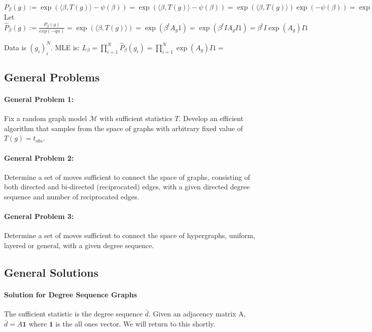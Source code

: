 \documentclass{article}
\theoremstyle{definition}
\begin{document}
\( P_\beta(g) := \exp( \langle \beta, T(g) \rangle - \psi(\beta) ) 
= \exp( \langle \beta, T(g) \rangle - \psi(\beta) ) 
= \exp( \langle \beta, T(g) \rangle) \exp( - \psi(\beta) ) 
= \exp( \langle \beta, T(g) \rangle) \exp( - qn ) 
\)
Let $\hat{P}_\beta(g) := \frac{P_\beta(g)}{exp(-qn)} = \exp( \langle \beta, T(g) \rangle) = \exp(\beta^t A_g 1) = \exp(\beta^t I A_g I 1) = \beta^t I \exp(A_g ) I 1  $

Data is $(g_i)_i^N$.
MLE is: $L_\beta = \prod_{i=1}^N \hat{P}_\beta(g_i) = \prod_{i=1}^N\exp(A_g ) I 1 = $

\subsection{General Problems}

\paragraph{General Problem 1:} Fix a random graph model $\mathcal{M}$ with sufficient statistics $T$. Develop an efficient algorithm that samples from the space of graphs with arbitrary fixed value of $T(g) = t_{obs}$.

\paragraph{General Problem 2:} Determine a set of moves sufficient to connect the space of graphs, consisting of both directed and bi-directed (reciprocated) edges, with a given directed degree sequence and number of reciprocated edges.

\paragraph{General Problem 3:} Determine a set of moves sufficient to connect the space of hypergraphs, uniform, layered or general, with a given degree sequence.

\subsection{General Solutions}
\paragraph{Solution for Degree Sequence Graphs}
The sufficient statistic is the degree sequence $\bar{d}$. Given an adjacency matrix A, $\bar{d} = A \mathbf{1}$ where $\mathbf{1}$ is the all ones vector. We will return to this shortly.
\end{document}
